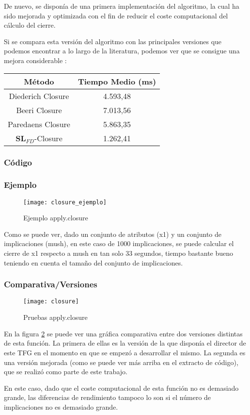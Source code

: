 De nuevo, se dispon\'ia de una primera implementaci\'on del algoritmo, la cual ha sido mejorada y optimizada con el fin de reducir el coste computacional del c\'alculo del cierre.

Si se compara esta versi\'on del algoritmo con las principales versiones que podemos encontrar a lo largo de la literatura, podemos ver que se consigue una mejora considerable \cite{Mora2012a}:

\begin{center}
    \begin{tabular}{c c}
        \hline
        M\'etodo & Tiempo Medio (ms) \\
        \hline
        Diederich Closure & 4.593,48 \\   
        Beeri Closure & 7.013,56 \\   
        Paredaens Closure & 5.863,35 \\  
        \(\textbf{SL}_{FD}\)-Closure & 1.262,41 \\  
    \end{tabular}
\end{center}
\newpage
\subsubsection{C\'odigo} 

\subsubsection{Ejemplo} 
\begin{figure}[h]
    \centering
    \texttt{[image: closure\_ejemplo]}
    \caption{Ejemplo apply.closure}
    \label{fig:closure_ejemplo}
\end{figure} 

Como se puede ver, dado un conjunto de atributos (x1) y un conjunto de implicaciones (mush), en este caso de 1000 implicaciones, se puede calcular el cierre de x1 respecto a mush en tan solo 33 segundos, tiempo bastante bueno teniendo en cuenta el tama\~no del conjunto de implicaciones.
\subsubsection{Comparativa/Versiones} 

\begin{figure}[H]
    \centering
    \texttt{[image: closure]}
    \caption{Pruebas apply.closure}
    \label{fig:closure}
\end{figure} 

En la figura \ref{fig:closure} se puede ver una gr\'afica comparativa entre dos versiones distintas de esta funci\'on. La primera de ellas es la versi\'on de la que dispon\'ia el director de este TFG en el momento en que se empez\'o a desarrollar el mismo. La segunda es una versi\'on mejorada (como se puede ver m\'as arriba en el extracto de c\'odigo), que se realiz\'o como parte de este trabajo.

En este caso, dado que el coste computacional de esta funci\'on no es demasiado grande, las diferencias de rendimiento tampoco lo son si el n\'umero de implicaciones no es demasiado grande.

